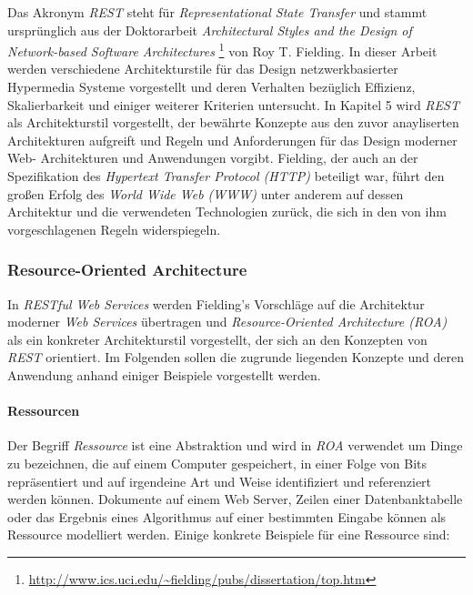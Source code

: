 Das Akronym \textit{REST} steht für \textit{Representational State
  Transfer} und stammt ursprünglich aus der Doktorarbeit
\textit{Architectural Styles and the Design of Network-based Software
  Architectures} \cite{Fielding2000}
\footnote{\url{http://www.ics.uci.edu/~fielding/pubs/dissertation/top.htm}}
von Roy T. Fielding. In dieser Arbeit werden verschiedene
Architekturstile für das Design netzwerkbasierter Hypermedia Systeme
vorgestellt und deren Verhalten bezüglich Effizienz, Skalierbarkeit
und einiger weiterer Kriterien untersucht. In Kapitel 5 wird
\textit{REST} als Architekturstil vorgestellt, der bewährte Konzepte
aus den zuvor anayliserten Architekturen aufgreift und Regeln und
Anforderungen für das Design moderner Web- Architekturen und
Anwendungen vorgibt. Fielding, der auch an der Spezifikation des
\textit{Hypertext Transfer Protocol (HTTP)}
 beteiligt war, führt
den großen Erfolg des \textit{World Wide Web (WWW)}
 unter anderem auf dessen
Architektur und die verwendeten Technologien zurück, die sich in den
von ihm vorgeschlagenen Regeln widerspiegeln.

\subsubsection{Resource-Oriented Architecture}

In \textit{RESTful Web Services} \cite{Richardson07} werden Fielding's
Vorschläge auf die Architektur moderner \textit{Web Services}
übertragen und \textit{Resource-Oriented Architecture (ROA)} als ein
konkreter Architekturstil vorgestellt, der sich an den Konzepten von
\textit{REST} orientiert. Im Folgenden sollen die zugrunde liegenden
Konzepte und deren Anwendung anhand einiger Beispiele vorgestellt
werden.

\paragraph{Ressourcen}

Der Begriff \textit{Ressource} ist eine Abstraktion und wird in
\textit{ROA} verwendet um Dinge zu bezeichnen, die auf einem Computer
gespeichert, in einer Folge von Bits repräsentiert und auf irgendeine
Art und Weise identifiziert und referenziert werden können. Dokumente
auf einem Web Server, Zeilen einer Datenbanktabelle oder das Ergebnis
eines Algorithmus auf einer bestimmten Eingabe können als Ressource
modelliert werden. Einige konkrete Beispiele für eine Ressource sind:

